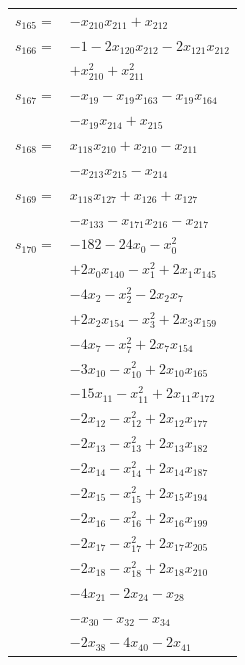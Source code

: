\begin{longtable}{@{}r@{\;}l@{}}
\(s_{165}=\) & \(\displaystyle -x_{210}x_{211} +x_{212}\) \\[3pt]
\(s_{166}=\) & \(\displaystyle -1 -2x_{120}x_{212} -2x_{121}x_{212}\) \\
 & \(\displaystyle +x_{210}^{2} +x_{211}^{2}\) \\[3pt]
\(s_{167}=\) & \(\displaystyle -x_{19} -x_{19}x_{163} -x_{19}x_{164}\) \\
 & \(\displaystyle -x_{19}x_{214} +x_{215}\) \\[3pt]
\(s_{168}=\) & \(\displaystyle x_{118}x_{210} +x_{210} -x_{211}\) \\
 & \(\displaystyle -x_{213}x_{215} -x_{214}\) \\[3pt]
\(s_{169}=\) & \(\displaystyle x_{118}x_{127} +x_{126} +x_{127}\) \\
 & \(\displaystyle -x_{133} -x_{171}x_{216} -x_{217}\) \\[3pt]
\(s_{170}=\) & \(\displaystyle -182 -24x_{0} -x_{0}^{2}\) \\
 & \(\displaystyle +2x_{0}x_{140} -x_{1}^{2} +2x_{1}x_{145}\) \\
 & \(\displaystyle -4x_{2} -x_{2}^{2} -2x_{2}x_{7}\) \\
 & \(\displaystyle +2x_{2}x_{154} -x_{3}^{2} +2x_{3}x_{159}\) \\
 & \(\displaystyle -4x_{7} -x_{7}^{2} +2x_{7}x_{154}\) \\
 & \(\displaystyle -3x_{10} -x_{10}^{2} +2x_{10}x_{165}\) \\
 & \(\displaystyle -15x_{11} -x_{11}^{2} +2x_{11}x_{172}\) \\
 & \(\displaystyle -2x_{12} -x_{12}^{2} +2x_{12}x_{177}\) \\
 & \(\displaystyle -2x_{13} -x_{13}^{2} +2x_{13}x_{182}\) \\
 & \(\displaystyle -2x_{14} -x_{14}^{2} +2x_{14}x_{187}\) \\
 & \(\displaystyle -2x_{15} -x_{15}^{2} +2x_{15}x_{194}\) \\
 & \(\displaystyle -2x_{16} -x_{16}^{2} +2x_{16}x_{199}\) \\
 & \(\displaystyle -2x_{17} -x_{17}^{2} +2x_{17}x_{205}\) \\
 & \(\displaystyle -2x_{18} -x_{18}^{2} +2x_{18}x_{210}\) \\
 & \(\displaystyle -4x_{21} -2x_{24} -x_{28}\) \\
 & \(\displaystyle -x_{30} -x_{32} -x_{34}\) \\
 & \(\displaystyle -2x_{38} -4x_{40} -2x_{41}\) \\

\end{longtable}
